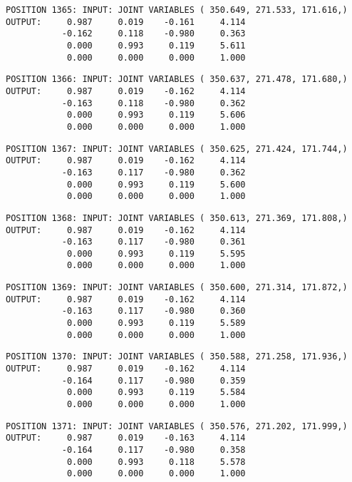 \begin{verbatim}
POSITION 1365: INPUT: JOINT VARIABLES ( 350.649, 271.533, 171.616,)
OUTPUT:     0.987     0.019    -0.161     4.114
           -0.162     0.118    -0.980     0.363
            0.000     0.993     0.119     5.611
            0.000     0.000     0.000     1.000
\end{verbatim} \pagebreak[1]\begin{verbatim}
POSITION 1366: INPUT: JOINT VARIABLES ( 350.637, 271.478, 171.680,)
OUTPUT:     0.987     0.019    -0.162     4.114
           -0.163     0.118    -0.980     0.362
            0.000     0.993     0.119     5.606
            0.000     0.000     0.000     1.000
\end{verbatim} \pagebreak[1]\begin{verbatim}
POSITION 1367: INPUT: JOINT VARIABLES ( 350.625, 271.424, 171.744,)
OUTPUT:     0.987     0.019    -0.162     4.114
           -0.163     0.117    -0.980     0.362
            0.000     0.993     0.119     5.600
            0.000     0.000     0.000     1.000
\end{verbatim} \pagebreak[1]\begin{verbatim}
POSITION 1368: INPUT: JOINT VARIABLES ( 350.613, 271.369, 171.808,)
OUTPUT:     0.987     0.019    -0.162     4.114
           -0.163     0.117    -0.980     0.361
            0.000     0.993     0.119     5.595
            0.000     0.000     0.000     1.000
\end{verbatim} \pagebreak[1]\begin{verbatim}
POSITION 1369: INPUT: JOINT VARIABLES ( 350.600, 271.314, 171.872,)
OUTPUT:     0.987     0.019    -0.162     4.114
           -0.163     0.117    -0.980     0.360
            0.000     0.993     0.119     5.589
            0.000     0.000     0.000     1.000
\end{verbatim} \pagebreak[1]\begin{verbatim}
POSITION 1370: INPUT: JOINT VARIABLES ( 350.588, 271.258, 171.936,)
OUTPUT:     0.987     0.019    -0.162     4.114
           -0.164     0.117    -0.980     0.359
            0.000     0.993     0.119     5.584
            0.000     0.000     0.000     1.000
\end{verbatim} \pagebreak[1]\begin{verbatim}
POSITION 1371: INPUT: JOINT VARIABLES ( 350.576, 271.202, 171.999,)
OUTPUT:     0.987     0.019    -0.163     4.114
           -0.164     0.117    -0.980     0.358
            0.000     0.993     0.118     5.578
            0.000     0.000     0.000     1.000
\end{verbatim} \pagebreak[1]\begin{verbatim}

\end{verbatim}
